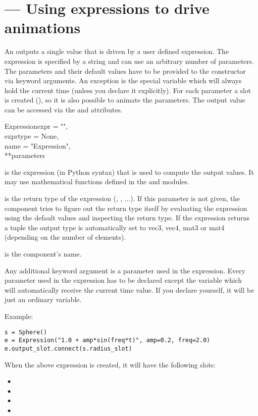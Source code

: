 
\section{ ---
         Using expressions to drive animations}

An  outputs a single value that is driven by a user
defined expression. The expression is specified by a string and can
use an arbitrary number of parameters. The parameters and their
default values have to be provided to the constructor via keyword
arguments. An exception is the special variable  which will always
hold the current time (unless you declare it explicitly).  For each
parameter a slot is created (), so it is also possible to
animate the parameters. The output value can be accessed via the
 and  attributes.

\begin{classdesc}{Expression}{expr = "",\\ 
			      exprtype = None, \\
                              name = "Expression", \\
                              **parameters}

 is the expression (in Python syntax) that is used to compute
the output values. It may use mathematical functions defined in the
 and  modules.

 is the return type of the expression (, 
, ...). If this parameter is not given, the component tries
to figure out the return type itself by evaluating the expression using
the default values and inspecting the return type. If the expression
returns a tuple the output type is automatically set to vec3, vec4, mat3
or mat4 (depending on the number of elements).

 is the component's name.

Any additional keyword argument is a parameter used in the expression.
Every parameter used in the expression has to be declared except the
variable  which will automatically receive the current time value.
If you declare  yourself, it will be just an ordinary variable.
\end{classdesc}


Example:

\begin{verbatim}
s = Sphere()
e = Expression("1.0 + amp*sin(freq*t)", amp=0.2, freq=2.0)
e.output_slot.connect(s.radius_slot)
\end{verbatim}

When the above expression is created, it will have the following slots:

\begin{itemize}
\item {}
\item {}
\item {}
\item {}
\end{itemize}